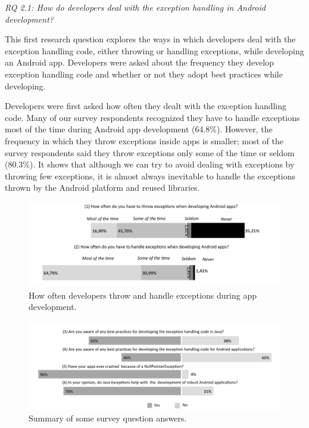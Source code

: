 \bigskip
\noindent\emph{RQ 2.1: How do developers deal with the exception handling in Android development?}
\bigskip

This first research question explores the ways in which developers deal with the exception handling code, either throwing or handling exceptions,  while developing an Android app.  Developers were asked about the frequency they develop exception handling code and whether or not they adopt best practices while developing.


Developers were first asked how often they dealt with the exception handling code. Many of our survey respondents recognized they have to handle exceptions most of the time during Android app development (64.8\%). However, the frequency in which they throw exceptions inside apps is smaller; most of the survey respondents said they throw exceptions only some of the time or seldom (80.3\%). It shows that although we can try to avoid dealing with exceptions by throwing few exceptions, it is almost always inevitable to handle the exceptions thrown by the Android platform and reused libraries. 

\begin{figure} \centering \includegraphics[scale=0.60]{charts/agree_new2.png}
\caption{How often developers throw and handle exceptions during app development.}
\label{fig:oftenhandle}
\end{figure}


\begin{figure} \centering \includegraphics[scale=0.60]{charts/yes_no_new2.png}
\caption{Summary of some survey question answers. }
\label{fig:oftenhandle}
\end{figure}

